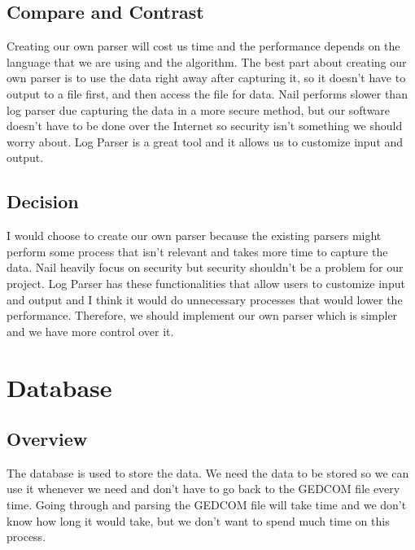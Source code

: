 \documentclass[onecolumn, draftclsnofoot,10pt, compsoc]{IEEEtran}
\begin{document}
\subsection{Compare and Contrast}
\begin{singlespace}
Creating our own parser will cost us time and the performance depends on the language that we are using and the algorithm. The best part about creating our own parser is to use the data right away after capturing it, so it doesn't have to output to a file first, and then access the file for data. Nail performs slower than log parser due capturing the data in a more secure method, but our software doesn't have to be done over the Internet so security isn't something we should worry about. Log Parser is a great tool and it allows us to customize input and output.
\end{singlespace}

\subsection{Decision}
\begin{singlespace}
I would choose to create our own parser because the existing parsers might perform some process that isn't relevant and takes more time to capture the data. Nail heavily focus on security but security shouldn't be a problem for our project. Log Parser has these functionalities that allow users to customize input and output and I think it would do unnecessary processes that would lower the performance. Therefore, we should implement our own parser which is simpler and we have more control over it.
\end{singlespace}


\section{Database}
\subsection{Overview}
\begin{singlespace}
The database is used to store the data. We need the data to be stored so we can use it whenever we need and don't have to go back to the GEDCOM file every time. Going through and parsing the GEDCOM file will take time and we don't know how long it would take, but we don't want to spend much time on this process. 
\end{singlespace}
\end{document}
